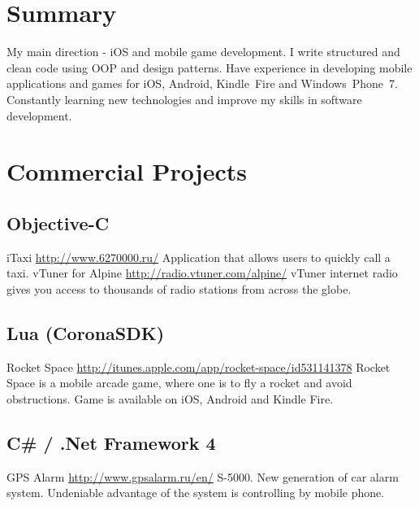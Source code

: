 \documentclass[11pt,a4paper]{moderncv}
\begin{document}
\maketitle

\section{Summary}
\cvline
  {}
  {My main direction - iOS and mobile game development.\newline{}
  I write structured and clean code using OOP and design patterns. Have experience in developing mobile applications and games for iOS, Android, Kindle~Fire and Windows~Phone~7. Constantly learning new technologies and improve my skills in software development.{}}

\section{Commercial Projects}
  \subsection{Objective-C}
  \cvline
    {iTaxi}
    {\url{http://www.6270000.ru/}\newline{}
    Application that allows users to quickly call a taxi.}
  \cvline
    {vTuner for Alpine}
    {\url{http://radio.vtuner.com/alpine/}\newline{}
    vTuner internet radio gives you access to thousands of radio stations from across the globe.}
    
  \subsection{Lua (CoronaSDK)}
  \cvline
    {Rocket Space}
    {\url{http://itunes.apple.com/app/rocket-space/id531141378}\newline{}
    Rocket Space is a mobile arcade game, where one is to fly a rocket and avoid obstructions.\newline
    Game is available on iOS, Android and Kindle Fire.}
    
  \subsection{C\# / .Net Framework 4}
  \cvline
    {GPS Alarm}
    {\url{http://www.gpsalarm.ru/en/}\newline{}
    S-5000. New generation of car alarm system.\newline
    Undeniable advantage of the system is controlling by mobile phone.}
\end{document}
